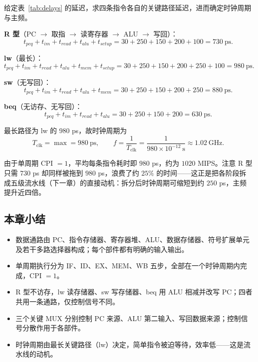 \begin{example}[单周期时钟周期的计算]
给定表~\ref{tab:delays} 的延迟，求四条指令各自的关键路径延迟，进而确定时钟周期与主频。

\textbf{R 型}（PC $\to$ 取指 $\to$ 读寄存器 $\to$ ALU $\to$ 写回）：
\begin{equation}
t_{pcq} + t_{im} + t_{read} + t_{alu} + t_{setup}
= 30 + 250 + 150 + 200 + 100 = 730\ \text{ps}.
\end{equation}

\textbf{lw}（最长）：
\begin{equation}
t_{pcq} + t_{im} + t_{read} + t_{alu} + t_{mem} + t_{setup}
= 30 + 250 + 150 + 200 + 250 + 100 = 980\ \text{ps}.
\end{equation}

\textbf{sw}（无写回）：
\begin{equation}
t_{pcq} + t_{im} + t_{read} + t_{alu} + t_{mem}
= 30 + 250 + 150 + 200 + 250 = 880\ \text{ps}.
\end{equation}

\textbf{beq}（无访存、无写回）：
\begin{equation}
t_{pcq} + t_{im} + t_{read} + t_{alu}
= 30 + 250 + 150 + 200 = 630\ \text{ps}.
\end{equation}

最长路径为 lw 的 $980$ ps，故时钟周期为
\begin{equation}
T_{\text{clk}} = \max = 980\ \text{ps}, \qquad
f = \frac{1}{T_{\text{clk}}} = \frac{1}{980 \times 10^{-12}\ \text{s}} \approx 1.02\ \text{GHz}.
\end{equation}

由于单周期 CPI $=1$，平均每条指令耗时即 $980$ ps，约为 $1020$ MIPS。注意 R 型只需 $730$ ps 却同样被拖到 $980$ ps，浪费了约 $25\%$ 的时间——这正是把各阶段拆成五级流水线（下一章）的直接动机：拆分后时钟周期可缩短到约 $250$ ps，主频提升近四倍。
\end{example}

\subsection{本章小结}

\begin{itemize}
    \item 数据通路由 PC、指令存储器、寄存器堆、ALU、数据存储器、符号扩展单元及若干多路选择器构成；每个部件都有明确的输入输出。
    \item 单周期执行分为 IF、ID、EX、MEM、WB 五步，全部在一个时钟周期内完成，CPI $=1$。
    \item R 型不访存，lw 读存储器、sw 写存储器、beq 用 ALU 相减并改写 PC；四者共用一条通路，仅控制信号不同。
    \item 三个关键 MUX 分别控制 PC 来源、ALU 第二输入、写回数据来源；控制信号分散作用于各部件。
    \item 时钟周期由最长关键路径（lw）决定，简单指令被迫等待，效率低——这是流水线的动机。
\end{itemize}

